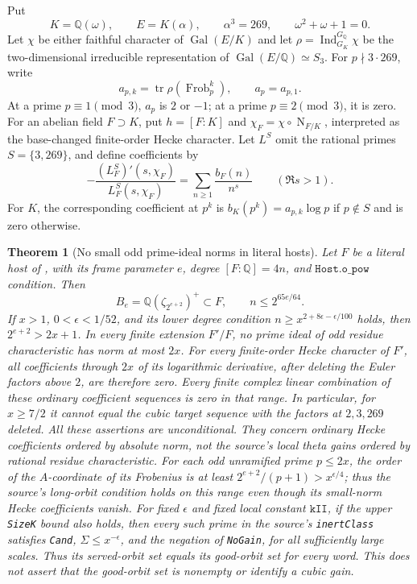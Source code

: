 \documentclass[11pt]{article}
\newtheorem{theorem}{Theorem}[section]
\theoremstyle{remark}\newtheorem{remark}[theorem]{Remark}
\newcommand{\Q}{\mathbb Q}
\newcommand{\Gal}{\operatorname{Gal}}
\newcommand{\N}{\operatorname N}
\newcommand{\tr}{\operatorname{tr}}
\begin{document}
Put
\[
 K=\Q(\omega),\qquad E=K(\alpha),\qquad \alpha^3=269,
 \qquad \omega^2+\omega+1=0.
\]
Let $\chi$ be either faithful character of $\Gal(E/K)$ and let
$\rho=\operatorname{Ind}_{G_K}^{G_\Q}\chi$ be the two-dimensional
irreducible representation of $\Gal(E/\Q)\simeq S_3$.
For $p\nmid3\cdot269$, write
\[
 a_{p,k}=\tr\rho(\operatorname{Frob}_p^k),\qquad a_p=a_{p,1}.
\]
At a prime $p\equiv1\pmod3$, $a_p$ is $2$ or $-1$; at a prime
$p\equiv2\pmod3$, it is zero.
For an abelian field $F\supset K$, put $h=[F:K]$ and
$\chi_F=\chi\circ\N_{F/K}$, interpreted as the base-changed
finite-order Hecke character. Let $L^S$ omit the rational primes
$S=\{3,269\}$, and define coefficients by
\[
 -\frac{(L_F^S)'(s,\chi_F)}{L_F^S(s,\chi_F)}
       =\sum_{n\ge1}\frac{b_F(n)}{n^s}
       \qquad(\Re s>1).
                                                        \tag{1.1}
\]
For $K$, the corresponding coefficient at $p^k$ is
$b_K(p^k)=a_{p,k}\log p$ if $p\notin S$ and is zero otherwise.

\begin{theorem}[No small odd prime-ideal norms in literal hosts]
\label{thm:empty-norms}
Let $F$ be a literal host of \citet{AlpogeLean2026}, with its frame
parameter $e$, degree $[F:\Q]=4n$, and $\texttt{Host.o\_pow}$
condition. Then
\[
 B_e=\Q(\zeta_{2^{e+2}})^+\subset F,\qquad
 n\le2^{65e/64}.
\]
If $x>1$, $0<\epsilon<1/52$, and its lower degree condition
$n\ge x^{2+8\epsilon-\epsilon/100}$ holds, then
$2^{e+2}>2x+1$. In every finite extension $F'/F$, no prime
ideal of odd residue characteristic has norm at most $2x$.
For every finite-order Hecke character of $F'$, all coefficients
through $2x$ of its logarithmic derivative, after deleting the
Euler factors above $2$, are therefore zero. Every finite complex
linear combination of these ordinary coefficient sequences is
zero in that range. In particular, for $x\ge7/2$ it cannot equal
the cubic target sequence with the factors at $2,3,269$ deleted.
All these assertions are unconditional. They concern ordinary
Hecke coefficients ordered by absolute norm, not the source's
local theta gains ordered by rational residue characteristic.
For each odd unramified prime $p\le2x$, the order of the
$A$-coordinate of its Frobenius is at least
$2^{e+2}/(p+1)>x^{\epsilon/4}$; thus the source's long-orbit
condition holds on this range even though its small-norm
Hecke coefficients vanish.
For fixed $\epsilon$ and fixed local constant $\texttt{kII}$, if the upper
\texttt{SizeK} bound also holds, then every such prime in the
source's \texttt{inertClass} satisfies \texttt{Cand},
$\Sigma\le x^{-\epsilon}$, and the negation of \texttt{NoGain},
for all sufficiently large scales. Thus its served-orbit set equals
its good-orbit set for every word. This does not assert that the
good-orbit set is nonempty or identify a cubic gain.
\end{theorem}
\end{document}
